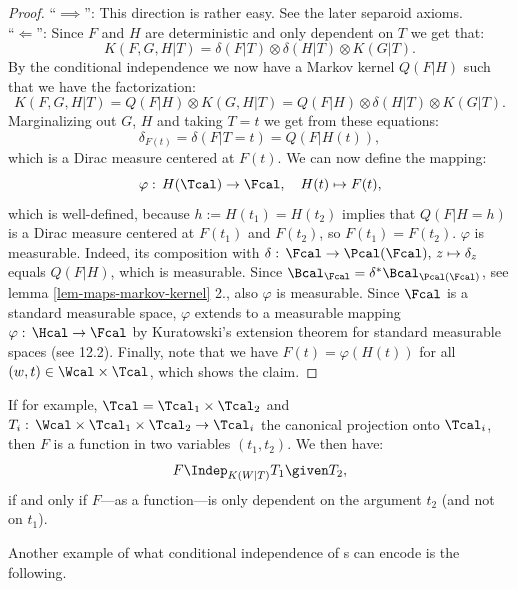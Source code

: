 \begin{Lem}
\begin{proof}
 ``$\implies$'': This direction is rather easy. See the later separoid axioms.\\
 ``$\Longleftarrow$'': Since $F$ and $H$ are deterministic and only dependent on $T$ we get that:
    \[ K(F,G,H|T) = \delta(F|T) \otimes \delta(H|T) \otimes K(G|T).  \]
    By the conditional independence we now have a Markov kernel $Q(F|H)$ such that we have the factorization:
    \[ K(F,G,H|T) = Q(F|H) \otimes K(G,H|T) = Q(F|H) \otimes \delta(H|T) \otimes K(G|T).  \]
    Marginalizing out $G$, $H$ and taking $T=t$ we get from these equations:
    \[ \delta_{F(t)} = \delta(F|T=t) = Q(F|H(t)),\]
    which is a Dirac measure centered at $F(t)$.
    We can now define the mapping:
    \[\varphi:\, H(\Tcal) \to \Fcal, \quad H(t) \mapsto F(t), \]
    which is well-defined, because $h:=H(t_1)=H(t_2)$ implies that $Q(F|H=h)$ is a Dirac measure centered at $F(t_1)$ and $F(t_2)$, so $F(t_1)=F(t_2)$.
    $\varphi$ is measurable.
    Indeed, its composition with $\delta:\,\Fcal \to \Pcal(\Fcal), \, z \mapsto \delta_z$ equals $Q(F|H)$, which is measurable.
    Since $\Bcal_\Fcal = \delta^*\Bcal_{\Pcal(\Fcal)}$, see lemma \ref{lem-maps-markov-kernel} 2., also $\varphi$ is measurable.
    Since $\Fcal$ is a standard measurable space, $\varphi$ extends to a measurable mapping $\varphi:\, \Hcal \to \Fcal$ by Kuratowski's extension theorem for standard measurable spaces (see \cite{Kec95} 12.2). 
    Finally, note that we have $F(t) = \varphi(H(t))$ for all $(w,t) \in \Wcal \times \Tcal$, which shows the claim.
\end{proof}
\end{Lem}


\begin{Eg}
    If for example, $\Tcal = \Tcal_1 \times \Tcal_2$ and $T_i:\,\Wcal \times \Tcal_1 \times \Tcal_2 \to \Tcal_i$ the canonical projection onto $\Tcal_i$,
    then $F$ is a function in two variables $(t_1,t_2)$.
    We then  have:
    \[ F \Indep_{K(W|T)} T_1 \given T_2,\]
    if and only if $F$---as a function---is only dependent on the argument $t_2$ (and not on $t_1$).
\end{Eg}

Another example of what conditional independence of \trv{}s can encode is the following.

